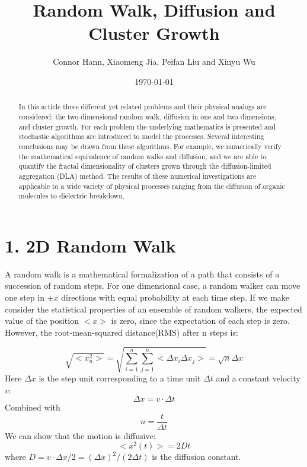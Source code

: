 \documentclass[aps,prl,preprint,superscriptaddress]{revtex4}
\begin{document}
	
	
	\title{Random Walk, Diffusion and Cluster Growth}%
	
	\author{Connor Hann, Xiaomeng Jia, Peifan Liu and Xinyu Wu}
	
	
	\date{\today}
	
	\begin{abstract}
		In this article three different yet related problems and their physical analogs are considered: the two-dimensional random walk, diffusion in one and two dimensions, and cluster growth. For each problem the underlying mathematics is presented and stochastic algorithms are introduced to model the processes. Several interesting conclusions may be drawn from these algorithms. For example, we numerically verify the mathematical equivalence of random walks and diffusion, and we are able to quantify the fractal dimensionality of clusters grown through the diffusion-limited aggregation (DLA) method. The results of these numerical investigations are applicable to a wide variety of physical processes ranging from the diffusion of organic molecules to dielectric breakdown. 
	\end{abstract}
	
	\maketitle
	
	
	
	\section{1. 2D Random Walk} 
	
	
	A random walk is a mathematical formalization of a path that consists of a succession of random steps. For one dimensional case, a random walker can move one step in $\pm x$ directions with equal probability at each time step. If we make consider the statistical properties of  an ensemble of random walkers, the expected value of the position $ <x> $ is zero, since the expectation of each step is zero. However, the root-mean-squared distance(RMS) after n steps is:
	
	\begin{equation}
	\sqrt{<x_n^2>} = \sqrt{\sum\limits_{i=1}^{n}\sum\limits_{j=1}^{n}<\Delta x_i\Delta x_j>} = \sqrt{n}\Delta x
	\end{equation} 
	Here $\Delta x$ is the step unit corresponding to a time unit $\Delta t$ and a constant velocity $v$:
	\begin{equation}
	\Delta x = v\cdot \Delta t
	\end{equation} 
	Combined with
	\begin{equation}
	n = \frac{t}{\Delta t}
	\end{equation}
	We can show that the motion is diffusive:
	\begin{equation}
	<x^2(t)> = 2Dt
	\end{equation}
	where $D = v\cdot\Delta x/2 = (\Delta x)^2/(2\Delta t)$ is the diffusion constant.
	
\end{document}
